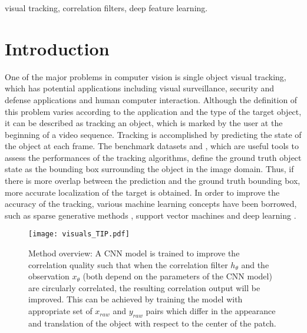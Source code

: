 \documentclass[journal]{IEEEtran}
\begin{document}
\let\svthefootnote\thefootnote
\let\thefootnote\relax{}


\addtocounter{footnote}{0}\let\thefootnote\svthefootnote

\begin{IEEEkeywords}
visual tracking, correlation filters, deep feature learning.
\end{IEEEkeywords}

\IEEEpeerreviewmaketitle
\section{Introduction}
\label{secIntro}
One of the major problems in computer vision is single object visual tracking, which has potential applications including visual surveillance, security and defense applications and human computer interaction. Although the definition of this problem varies according to the application and the type of the target object, it can be described as tracking an object, which is marked by the user at the beginning of a video sequence. Tracking is accomplished by predicting the state of the object at each frame. The benchmark datasets  \cite{Benchmark2013} and \cite{BenchmarkPAMI}, which are useful tools to assess the performances of the tracking algorithms, define the ground truth object state as the bounding box surrounding the object in the image domain. Thus, if there is more overlap between the prediction and the ground truth bounding box, more accurate localization of the target is obtained. In order to improve the accuracy of the tracking, various machine learning concepts have been borrowed, such as sparse generative methods \cite{L1APG, L1Other}, support vector machines \cite{STRUCK} and deep learning \cite{MDNET, PorikliBMVC2}.
\begin{figure}[ht]
\centering
\texttt{[image: visuals\_TIP.pdf]}
\caption{\small Method overview: A CNN model is trained to improve the correlation quality such that when the correlation filter $h_\theta$ and the observation $x_\theta$ (both depend on the parameters of the CNN model) are circularly correlated, the resulting correlation output will be improved. This can be achieved by training the model with appropriate set of $x_{raw}$ and $y_{raw}$ pairs which differ in the appearance and translation of the object with respect to the center of the patch.}
\label{algflow}
\normalsize
\end{figure}
\end{document}
